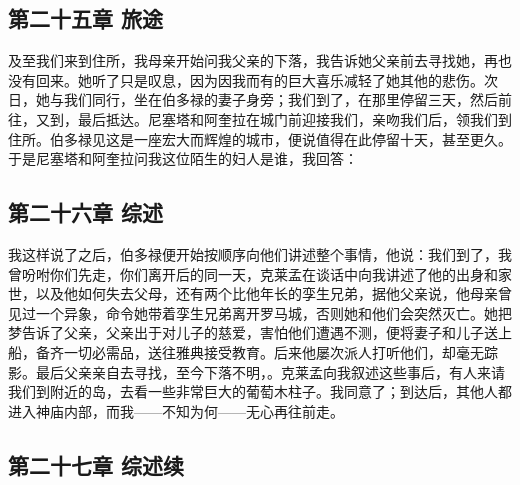 \subsection{第二十五章 旅途}

及至我们来到住所，我母亲开始问我父亲的下落，我告诉她父亲前去寻找她，再也没有回来。她听了只是叹息，因为因我而有的巨大喜乐减轻了她其他的悲伤。次日，她与我们同行，坐在伯多禄的妻子身旁；我们到了，在那里停留三天，然后前往，又到，最后抵达。尼塞塔和阿奎拉在城门前迎接我们，亲吻我们后，领我们到住所。伯多禄见这是一座宏大而辉煌的城市，便说值得在此停留十天，甚至更久。于是尼塞塔和阿奎拉问我这位陌生的妇人是谁，我回答：\par


\subsection{第二十六章 综述}

我这样说了之后，伯多禄便开始按顺序向他们讲述整个事情，他说：我们到了，我曾吩咐你们先走，你们离开后的同一天，克莱孟在谈话中向我讲述了他的出身和家世，以及他如何失去父母，还有两个比他年长的孪生兄弟，据他父亲说，他母亲曾见过一个异象，命令她带着孪生兄弟离开罗马城，否则她和他们会突然灭亡。她把梦告诉了父亲，父亲出于对儿子的慈爱，害怕他们遭遇不测，便将妻子和儿子送上船，备齐一切必需品，送往雅典接受教育。后来他屡次派人打听他们，却毫无踪影。最后父亲亲自去寻找，至今下落不明，。克莱孟向我叙述这些事后，有人来请我们到附近的岛，去看一些非常巨大的葡萄木柱子。我同意了；到达后，其他人都进入神庙内部，而我——不知为何——无心再往前走。\par


\subsection{第二十七章 综述续}

\par

